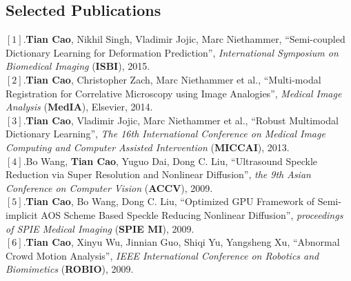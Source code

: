\documentclass[line,margin]{res}
\newenvironment{bullets}{\begin{list}{\tiny$\bullet$}{\topsep 0pt \itemsep -2pt \leftmargin .15in}}{\vspace*{4pt}\end{list}}
\begin{document}
\begin{resume}
		
		
		\section{\sc Selected Publications}  
		\smallskip
		$[1]$.\textbf{Tian Cao}, Nikhil Singh, Vladimir Jojic, Marc Niethammer, ``Semi-coupled Dictionary Learning for Deformation Prediction'', \emph{International Symposium on Biomedical Imaging} (\textbf{ISBI}), 2015. \vspace{.05in}\\
		$[2]$.\textbf{Tian Cao}, Christopher Zach, Marc Niethammer et al., ``Multi-modal Registration for Correlative Microscopy using Image Analogies'', \emph{Medical Image Analysis} (\textbf{MedIA}), Elsevier, 2014. \vspace{.05in}\\
		$[3]$.\textbf{Tian Cao}, Vladimir Jojic, Marc Niethammer et al., ``Robust Multimodal Dictionary Learning'', \emph{The 16th International Conference on Medical Image Computing and Computer Assisted Intervention} (\textbf{MICCAI}), 2013. \vspace{.05in}\\
		$[4]$.Bo Wang, \textbf{Tian Cao}, Yuguo Dai, Dong C. Liu, ``Ultrasound Speckle Reduction via Super Resolution and Nonlinear Diffusion'',  \emph{the 9th Asian Conference on Computer Vision} (\textbf{ACCV}), 2009. \vspace{.05in}\\
		$[5]$.\textbf{Tian Cao}, Bo Wang, Dong C. Liu, ``Optimized GPU Framework of Semi-implicit AOS
		Scheme Based Speckle Reducing Nonlinear Diffusion'',  \emph{proceedings of SPIE Medical Imaging} (\textbf{SPIE MI}), 2009.\vspace{.05in}\\%
		$[6]$.\textbf{Tian Cao}, Xinyu Wu, Jinnian Guo, Shiqi Yu, Yangsheng Xu, ``Abnormal Crowd Motion Analysis'', \emph{IEEE International Conference on Robotics and Biomimetics} (\textbf{ROBIO}), 2009.
		

\end{resume}
\end{document}
